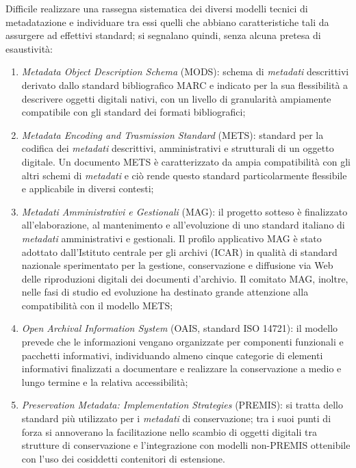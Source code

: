 {{Difficile realizzare una rassegna sistematica dei diversi modelli
tecnici di metadatazione e individuare tra essi quelli che abbiano
caratteristiche tali da assurgere ad effettivi standard; si segnalano
quindi, senza alcuna pretesa di esaustività:

\begin{enumerate}
\def\labelenumi{\arabic{enumi}.}
\item
  \emph{Metadata Object Description Schema} (MODS): schema di
  \emph{metadati} descrittivi derivato dallo standard bibliografico MARC
  e indicato per la sua flessibilità a descrivere oggetti digitali
  nativi, con un livello di granularità ampiamente compatibile con gli
  standard dei formati bibliografici;
\item
  \emph{Metadata Encoding and Trasmission Standard} (METS): standard per
  la codifica dei \emph{metadati} descrittivi, amministrativi e
  strutturali di un oggetto digitale. Un documento METS è caratterizzato
  da ampia compatibilità con gli altri schemi di \emph{metadati} e ciò
  rende questo standard particolarmente flessibile e applicabile in
  diversi contesti;
\item
  \emph{Metadati Amministrativi e Gestionali} (MAG): il progetto sotteso
  è finalizzato all'elaborazione, al mantenimento e all'evoluzione di
  uno standard italiano di \emph{metadati} amministrativi e gestionali.
  Il profilo applicativo MAG è stato adottato dall'Istituto centrale per
  gli archivi (ICAR) in qualità di standard nazionale sperimentato per
  la gestione, conservazione e diffusione via Web delle riproduzioni
  digitali dei documenti d'archivio. Il comitato MAG, inoltre, nelle
  fasi di studio ed evoluzione ha destinato grande attenzione alla
  compatibilità con il modello METS;
\item
  \emph{Open Archival Information System} (OAIS, standard ISO 14721): il
  modello prevede che le informazioni vengano organizzate per componenti
  funzionali e pacchetti informativi, individuando almeno cinque
  categorie di elementi informativi finalizzati a documentare e
  realizzare la conservazione a medio e lungo termine e la relativa
  accessibilità;
\item
  \emph{Preservation Metadata: Implementation Strategies} (PREMIS): si
  tratta dello standard più utilizzato per i \emph{metadati} di
  conservazione; tra i suoi punti di forza si annoverano la
  facilitazione nello scambio di oggetti digitali tra strutture di
  conservazione e l'integrazione con modelli non-PREMIS ottenibile con
  l'uso dei cosiddetti contenitori di estensione.
\end{enumerate}

}}
